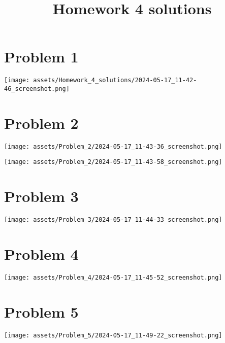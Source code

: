 \documentclass{amsart}
\date{}
\title{Homework 4 solutions}
\begin{document}
\maketitle
\section{Problem 1}
\label{sec:orga13182a}
\begin{center}
\texttt{[image: assets/Homework\_4\_solutions/2024-05-17\_11-42-46\_screenshot.png]}
\end{center}
\section{Problem 2}
\label{sec:orga4730eb}

\begin{center}
\texttt{[image: assets/Problem\_2/2024-05-17\_11-43-36\_screenshot.png]}
\end{center}

\begin{center}
\texttt{[image: assets/Problem\_2/2024-05-17\_11-43-58\_screenshot.png]}
\end{center}
\section{Problem 3}
\label{sec:org265cf79}
\begin{center}
\texttt{[image: assets/Problem\_3/2024-05-17\_11-44-33\_screenshot.png]}
\end{center}
\section{Problem 4}
\label{sec:org463ff64}

\begin{center}
\texttt{[image: assets/Problem\_4/2024-05-17\_11-45-52\_screenshot.png]}
\end{center}
\section{Problem 5}
\label{sec:orgfe63557}

\begin{center}
\texttt{[image: assets/Problem\_5/2024-05-17\_11-49-22\_screenshot.png]}
\end{center}
\end{document}
